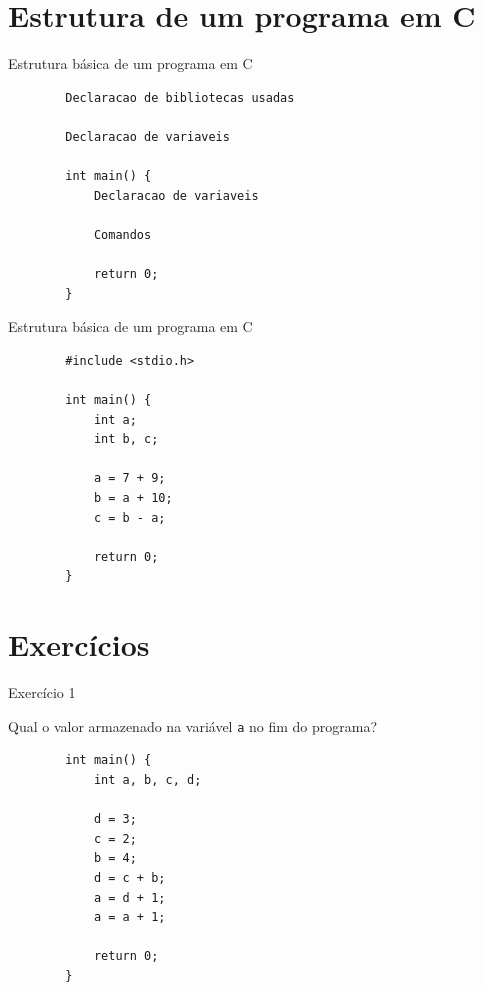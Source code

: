 \documentclass[handout]{beamer}
\begin{document}
\section{Estrutura de um programa em C}

\begin{frame}[fragile]{Estrutura básica de um programa em C}

    \begin{verbatim}
        Declaracao de bibliotecas usadas

        Declaracao de variaveis

        int main() {
            Declaracao de variaveis

            Comandos

            return 0;
        }
    \end{verbatim}

\end{frame}

\begin{frame}[fragile]{Estrutura básica de um programa em C}

    \begin{verbatim}
        #include <stdio.h>

        int main() {
            int a;
            int b, c;

            a = 7 + 9;
            b = a + 10;
            c = b - a;

            return 0;
        }
    \end{verbatim}

\end{frame}


\section{Exercícios}

\begin{frame}[fragile]{Exercício 1}

    Qual o valor armazenado na variável \texttt{a} no fim do programa?

    \begin{verbatim}
        int main() {
            int a, b, c, d;

            d = 3;
            c = 2;
            b = 4;
            d = c + b;
            a = d + 1;
            a = a + 1;

            return 0;
        }
    \end{verbatim}

\end{frame}
\end{document}
